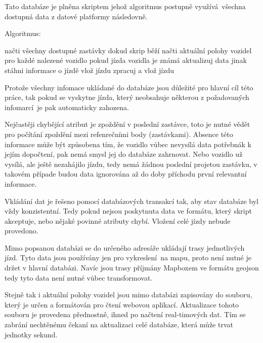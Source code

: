 Tato databáze je plněna skriptem jehož algoritmus postupně využívá všechna dostupná data z datové platformy následovně.

\bigbreak

Algoritmus:
\begin{code}[frame=none]
načti všechny dostupné zastávky
dokud skrip běží
	načti aktuální polohy vozidel
	pro každé nalezené vozidlo
		pokud jízda vozidla je známá
			aktualizuj data
		jinak
			stáhni informace o jízdě
			vlož jízdu
			zpracuj a vlož jízdu
\end{code}

\bigbreak

Protože všechny infomace ukládané do databáze jsou důležité pro hlavní cíl této práce, tak pokud se vyskytne jízda, který neobsahuje některou z požadovaných infomarcí je pak automaticky zahozena.

\bigbreak

Nejčastěji chybějící atribut je zpoždění v poslední zastávce, toto je nutné vědět pro počítání zpoždění mezi refenrečními body (zastávkami). Absence této informace může být způsobena tím, že vozidlo vůbec nevysílá data potřebnák k jejím dopočtení, pak nemá smysl jej do databáze zahrnovat. Nebo vozidlo už vysílá, ale ještě nezahájilo jízdu, tedy nemá žádnou poslední projetou zastávku, v takovém případe budou data ignorována až do doby příchodu první relevantní informace.

\bigbreak

Vkládání dat je řešeno pomocí databázových transakcí tak, aby stav databáze byl vždy konzistentní. Tedy pokud nejsou poskytnuta data ve formátu, který skript akceptuje, nebo nějaké povinné atributy chybí. Vložení celé jízdy nebude provedono.

\bigbreak

Mimo popsanou databázi se do určeného adresáře ukládají trasy jednotlivých jízd. Tyto data jsou používány jen pro vykreslení na mapu, proto není nutné je držet v hlavní databázi. Navíc jsou trasy příjmány Mapboxem ve formátu \gls{geojson} tedy tyto data není nutné vůbec transformovat.

\bigbreak

 Stejně tak i aktuální polohy vozidel jsou mimo databázi zapisovány do souboru, který je určen a formátován pro čtení webovou aplikací. Aktualizace tohoto souboru je provedena přednostně, ihned po načtení real-timových dat. Tím se zabrání nechtěnému čekaní na aktualizaci celé databáze, která může trvat jednotky sekund.
